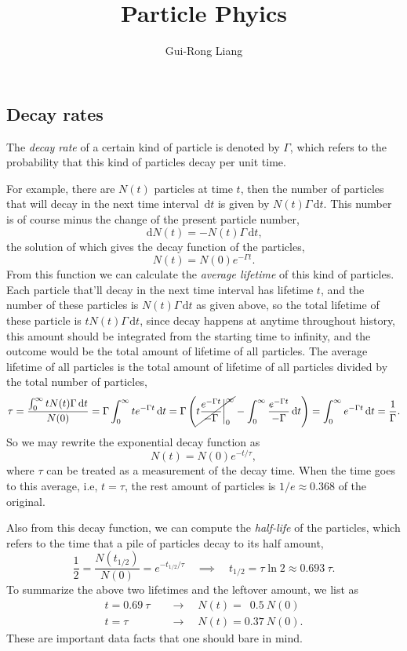 \documentclass{article}
\title{Particle Phyics}
\author{Gui-Rong Liang}
\newcommand{\be}{\begin{equation}}
\newcommand{\ee}{\end{equation}}
\newcommand{\dif}{\,\mathrm{d}}
\renewcommand{\1}{\left}
\renewcommand{\2}{\right}
\begin{document}
\maketitle
\tableofcontents

\newpage


\subsection{Decay rates}
The \textit{decay rate} of a certain kind of particle is denoted by $\Gamma$, which refers to the probability that this kind of particles decay per unit time. 

For example, there are $N(t)$ particles at time $t$, then the number of particles that will decay in the next time interval $\dif t$ is given by $N(t)\Gamma\dif t$. This number is of course minus the change of the present particle number,
\be
\dif N(t)=-N(t)\Gamma\dif t,
\ee
the solution of which gives the decay function of the particles,
\be
N(t)=N(0)e^{-\Gamma t}.
\ee
From this function we can calculate the \textit{average lifetime} of this kind of particles. Each particle that'll decay in the next time interval has lifetime $t$, and the number of these particles is $N(t)\Gamma\dif t$ as given above, so the total lifetime of these particle is $tN(t)\Gamma\dif t$, since decay happens at anytime throughout history, this amount should be integrated from the starting time to infinity, and the outcome would be the total amount of lifetime of all particles. The average lifetime of all particles is the total amount of lifetime of all particles divided by the total number of particles,
\be
\tau=\frac{\int_0^\infty tN(t)\Gamma\dif t}{N(0)}=\Gamma\int_0^\infty te^{-\Gamma t}\dif t=\Gamma\1(\cancel{t\frac{e^{-\Gamma t}}{-\Gamma}\bigg|_0^\infty}-\int_0^\infty\frac{e^{-\Gamma t}}{-\Gamma}\dif t\2)=\int_0^\infty e^{-\Gamma t}\dif t=\frac1\Gamma.
\ee
So we may rewrite the exponential decay function as
\be
N(t)=N(0)e^{-t/\tau},
\ee
where $\tau$ can be treated as a measurement of the decay time. When the time goes to this average, i.e, $t=\tau$, the rest amount of particles is $1/e\approx 0.368$ of the original.

Also from this decay function, we can compute the \textit{half-life} of the particles, which refers to the time that a pile of particles decay to its half amount,
\be
\frac1 2=\frac{N(t_{1/2})}{N(0)}=e^{-t_{1/2}/\tau} \quad\implies\quad t_{1/2}=\tau\ln 2\approx 0.693\ \tau.
\ee
To summarize the above two lifetimes and the leftover amount, we list as
\be\begin{split}
t=0.69\ \tau &\quad\longrightarrow\quad N(t)=\phantom{5}0.5\ N(0)\\
t=\tau\phantom{0.69\ } &\quad\longrightarrow\quad N(t)=0.37\ N(0).
\end{split}\ee
These are important data facts that one should bare in mind.
\end{document}
